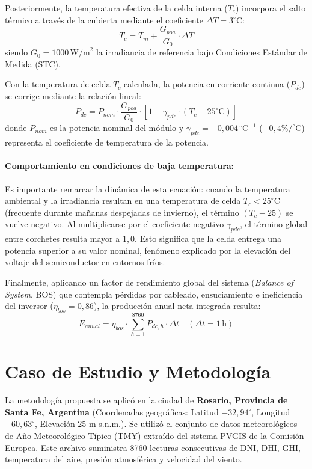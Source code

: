 \documentclass[12pt, a4paper, twocolumn]{article}
\begin{document}
Posteriormente, la temperatura efectiva de la celda interna ($T_c$) incorpora el salto térmico a través de la cubierta mediante el coeficiente $\Delta T = 3^\circ\text{C}$:
\begin{equation}
T_c = T_m + \frac{G_{poa}}{G_0} \cdot \Delta T
\end{equation}
siendo $G_0 = 1000\,\text{W/m}^2$ la irradiancia de referencia bajo Condiciones Estándar de Medida (STC).

Con la temperatura de celda $T_c$ calculada, la potencia en corriente continua ($P_{dc}$) se corrige mediante la relación lineal:
\begin{equation}
P_{dc} = P_{nom} \cdot \frac{G_{poa}}{G_0} \cdot \left[ 1 + \gamma_{pdc} \cdot (T_c - 25^\circ\text{C}) \right]
\end{equation}
donde $P_{nom}$ es la potencia nominal del módulo y $\gamma_{pdc} = -0,004\,^\circ\text{C}^{-1}$ ($-0,4\%/^\circ\text{C}$) representa el coeficiente de temperatura de la potencia.

\paragraph{Comportamiento en condiciones de baja temperatura:}
Es importante remarcar la dinámica de esta ecuación: cuando la temperatura ambiental y la irradiancia resultan en una temperatura de celda $T_c < 25^\circ\text{C}$ (frecuente durante mañanas despejadas de invierno), el término $(T_c - 25)$ se vuelve negativo. Al multiplicarse por el coeficiente negativo $\gamma_{pdc}$, el término global entre corchetes resulta mayor a $1,0$. Esto significa que la celda entrega una potencia superior a su valor nominal, fenómeno explicado por la elevación del voltaje del semiconductor en entornos fríos.

Finalmente, aplicando un factor de rendimiento global del sistema (\textit{Balance of System}, BOS) que contempla pérdidas por cableado, ensuciamiento e ineficiencia del inversor ($\eta_{bos} = 0,86$), la producción anual neta integrada resulta:
\begin{equation}
E_{anual} = \eta_{bos} \cdot \sum_{h=1}^{8760} P_{dc, h} \cdot \Delta t \quad (\Delta t = 1\,\text{h})
\end{equation}

\section{Caso de Estudio y Metodología}
La metodología propuesta se aplicó en la ciudad de \textbf{Rosario, Provincia de Santa Fe, Argentina} (Coordenadas geográficas: Latitud $-32,94^\circ$, Longitud $-60,63^\circ$, Elevación 25 m s.n.m.). Se utilizó el conjunto de datos meteorológicos de Año Meteorológico Típico (TMY) extraído del sistema PVGIS de la Comisión Europea. Este archivo suministra 8760 lecturas consecutivas de DNI, DHI, GHI, temperatura del aire, presión atmosférica y velocidad del viento.
\end{document}
